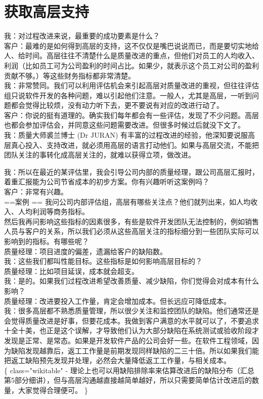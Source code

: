 \chapter{获取高层支持} %


我：对过程改进来说，最重要的成功要素是什么？\\
客户：最难的是如何得到高层的支持，这不仅仅是嘴巴说说而已，而是要切实地给人、给时间。高层往往不清楚什么是质量改进的重点，但他们对员工的人均收入、利润（比如员工可为公司盈利的时间占比。如果少，就表示这个员工对公司的盈利贡献不够。）等这些财务指标都非常清楚。\\
我：非常赞同。我们可以利用评估机会来引起高层对质量改进的重视，但往往评估组只说软件开发的各种问题，难以引起他们注意。一般人，尤其是高层，一听到问题都会觉得比较烦，没有动力听下去，更不要说有对应的改进行动了。\\
客户：你说的挺有道理的。确实我们每年都会有一些评估，发现了不少问题。高层也都会参加评估会，并同意这些问题需要改进。但很多时候过后就没下文了。\\
我：质量大师裘兰博士 (Dr JURAN)
有丰富的过程改进的经验，他深知要说服高层真心投入、支持改进，就必须用高层的语言打动他们。如果与高层交流，不能把团队关注的事转化成高层关注的，就难以获得立项，做改进。

我：所以在最近的某评估里，我会引导公司内部的质量经理，跟公司高层汇报时，着重汇报能为公司节省成本的初步方案。你有兴趣听听这案例吗？\\
客户：非常有兴趣。\\
==案例 ==
我问公司内部评估组，高层有哪些关注点？他们就列出来，如人均收入、人均利润等商务指标。\\
然后我再问影响这些指标的因素很多，有些是软件开发团队无法控制的，例如销售人员与客户的关系，所以我们必须从这些高层关注的指标细分到一些团队实际可以影响到的指标。有哪些呢？\\
质量经理：项目进度的偏差，遗漏给客户的缺陷数。\\
我：这些我们都叫性能目标。这些指标是如何影响高层目标的？\\
质量经理：比如项目延误，成本就会超支。\\
我：是的。如果我们过程改进希望改善质量、减少缺陷，你们觉得会对成本有什么影响？\\
质量经理：改进要投入工作量，肯定会增加成本。但长远应可降低成本。\\
我：很多高层都不熟悉质量管理，所以很少关注和监控团队的缺陷。他们通常还是会觉得质量改进是好事，但要花成本。我做到客户满意的水平就可以了，不要追求十全十美，也正是这个误解，才导致他们认为大部分缺陷在系统测试或验收阶段才发现是正常、是常态。如果是开发软件产品的公司会好一些。在软件工程领域，因为缺陷发现越靠后，返工工作量是前期发现同样缺陷的二三十倍。所以如果我们能把返工缺陷预先发现并处理，必然会大量降低返工工作量，与相关成本。\\
\{\textbar{} class="wikitable" \textbar{}- \textbar{}
理论上也可以用缺陷排除率来估算改进后的缺陷分布（汇总第5部分细讲），但与高层沟通越直接越简单越好，所以只需要简单估计改进后的数量，大家觉得合理便可。
\textbar{}\}

